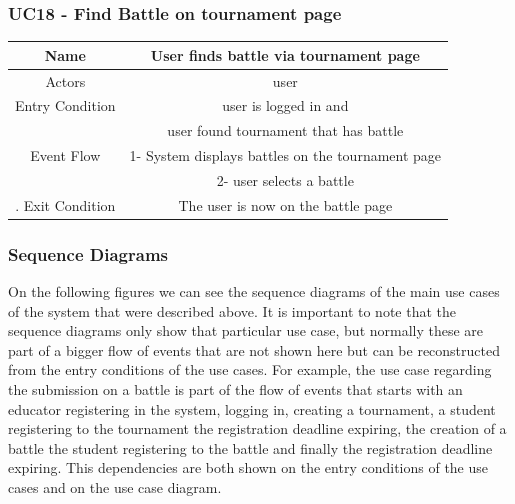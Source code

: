 \documentclass{article}
\begin{document}
\subsubsection*{UC18 - Find Battle on tournament page}

\begin{tabular*}{\linewidth}{@{\extracolsep{\fill}} cc }
    \hline
    Name & User finds battle via tournament page\\ 
    \hline
    Actors & user\\ 
    \hline
    Entry Condition & user is logged in and\\
                    & user found tournament that has battle\\
    \hline
    Event Flow & 1- System displays battles on the tournament page\\
               & 2- user selects a battle\\
    \hline.
    Exit Condition & The user is now on the battle page\\
                
    \hline
\end{tabular*}

\subsubsection{Sequence Diagrams}

On the following figures we can see the sequence diagrams of the main use cases of the system that were described above.
It is important to note that the sequence diagrams only show that particular use case, but normally
these are part of a bigger flow of events that are not shown here but can be reconstructed from the entry conditions
of the use cases. For example, the use case regarding the submission on a battle is part of the flow of events
that starts with an educator registering in the system, logging in, creating a tournament, a student registering to the tournament
the registration deadline expiring, the creation of a battle the student registering to the battle and finally the registration deadline
expiring. This dependencies are both shown on the entry conditions of the use cases and on the use case diagram.
\end{document}
